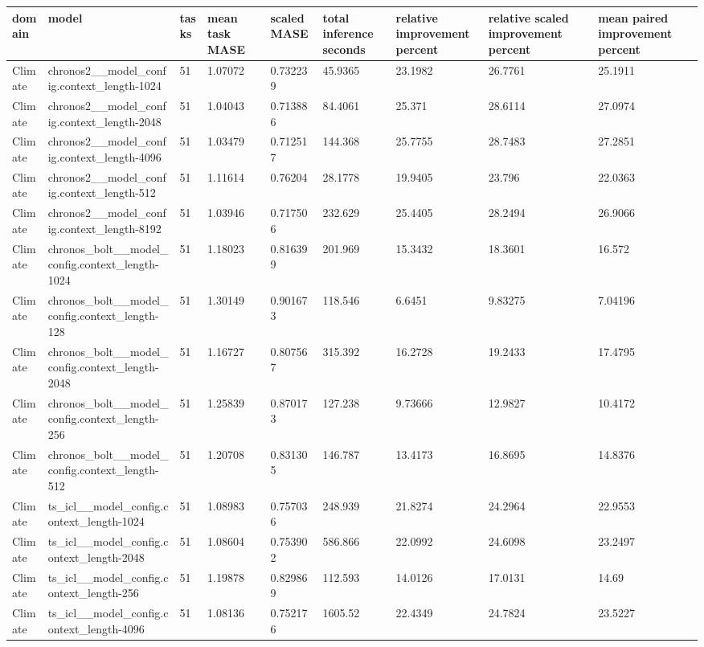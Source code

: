 \begin{tabular}{lllllllll}
\toprule
domain & model & tasks & mean task MASE & scaled MASE & total inference seconds & relative improvement percent & relative scaled improvement percent & mean paired improvement percent \\
\midrule
Climate & chronos2\_\_model\_config.context\_length-1024 & 51 & 1.07072 & 0.732239 & 45.9365 & 23.1982 & 26.7761 & 25.1911 \\
Climate & chronos2\_\_model\_config.context\_length-2048 & 51 & 1.04043 & 0.713886 & 84.4061 & 25.371 & 28.6114 & 27.0974 \\
Climate & chronos2\_\_model\_config.context\_length-4096 & 51 & 1.03479 & 0.712517 & 144.368 & 25.7755 & 28.7483 & 27.2851 \\
Climate & chronos2\_\_model\_config.context\_length-512 & 51 & 1.11614 & 0.76204 & 28.1778 & 19.9405 & 23.796 & 22.0363 \\
Climate & chronos2\_\_model\_config.context\_length-8192 & 51 & 1.03946 & 0.717506 & 232.629 & 25.4405 & 28.2494 & 26.9066 \\
Climate & chronos\_bolt\_\_model\_config.context\_length-1024 & 51 & 1.18023 & 0.816399 & 201.969 & 15.3432 & 18.3601 & 16.572 \\
Climate & chronos\_bolt\_\_model\_config.context\_length-128 & 51 & 1.30149 & 0.901673 & 118.546 & 6.6451 & 9.83275 & 7.04196 \\
Climate & chronos\_bolt\_\_model\_config.context\_length-2048 & 51 & 1.16727 & 0.807567 & 315.392 & 16.2728 & 19.2433 & 17.4795 \\
Climate & chronos\_bolt\_\_model\_config.context\_length-256 & 51 & 1.25839 & 0.870173 & 127.238 & 9.73666 & 12.9827 & 10.4172 \\
Climate & chronos\_bolt\_\_model\_config.context\_length-512 & 51 & 1.20708 & 0.831305 & 146.787 & 13.4173 & 16.8695 & 14.8376 \\
Climate & ts\_icl\_\_model\_config.context\_length-1024 & 51 & 1.08983 & 0.757036 & 248.939 & 21.8274 & 24.2964 & 22.9553 \\
Climate & ts\_icl\_\_model\_config.context\_length-2048 & 51 & 1.08604 & 0.753902 & 586.866 & 22.0992 & 24.6098 & 23.2497 \\
Climate & ts\_icl\_\_model\_config.context\_length-256 & 51 & 1.19878 & 0.829869 & 112.593 & 14.0126 & 17.0131 & 14.69 \\
Climate & ts\_icl\_\_model\_config.context\_length-4096 & 51 & 1.08136 & 0.752176 & 1605.52 & 22.4349 & 24.7824 & 23.5227 \\

\end{tabular}
